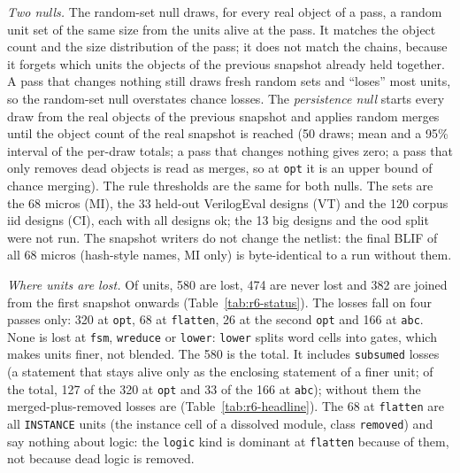 \documentclass[conference]{IEEEtran}
\newcommand{\code}[1]{\texttt{#1}}
\begin{document}
\emph{Two nulls.} The random-set null draws, for every real object of a pass, a random unit set of the same size from the
units alive at the pass. It matches the object count and the size distribution of the pass; it does not match the chains,
because it forgets which units the objects of the previous snapshot already held together. A pass that changes nothing still
draws fresh random sets and ``loses'' most units, so the random-set null overstates chance losses. The \emph{persistence null}
starts every draw from the real objects of the previous snapshot and applies random merges until the object count of the real
snapshot is reached (50 draws; mean and a 95\% interval of the per-draw totals; a pass that changes nothing gives zero; a pass
that only removes dead objects is read as merges, so at \code{opt} it is an upper bound of chance merging). The rule
thresholds are the same for both nulls. The sets are the 68 micros (MI), the 33 held-out VerilogEval designs (VT) and the 120
corpus iid designs (CI), each with all designs ok; the 13 big designs and the ood split were not run. The snapshot writers do
not change the netlist: the final BLIF of all 68 micros (hash-style names, MI only) is byte-identical to a run without them.

\emph{Where units are lost.} Of \rsxUnitsAll{} units, 580 are lost, 474 are never lost and 382 are
joined from the first snapshot onwards (Table~\ref{tab:r6-status}). The losses fall on four
passes only: 320 at \code{opt}, 68 at \code{flatten}, 26 at the second \code{opt} and 166 at
\code{abc}. None is lost at \code{fsm}, \code{wreduce} or \code{lower}: \code{lower} splits word
cells into gates, which makes units finer, not blended. The 580 is the total. It includes
\rsxSubsumedAll{} \code{subsumed} losses (a statement that stays alive only as the enclosing
statement of a finer unit; \rsxSubsumedShare{} of the total, 127 of the 320 at \code{opt} and 33 of
the 166 at \code{abc}); without them the merged-plus-removed losses are \rsxLostNoSub{}
(Table~\ref{tab:r6-headline}). The 68 at \code{flatten} are all \code{INSTANCE} units (the instance
cell of a dissolved module, class \code{removed}) and say nothing about logic: the \code{logic}
kind is dominant at \code{flatten} because of them, not because dead logic is removed.
\end{document}
